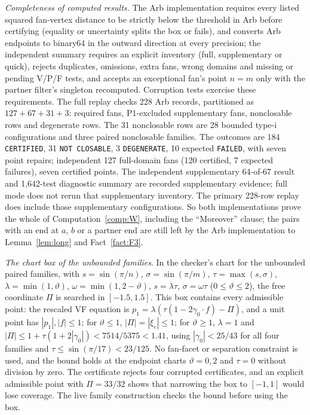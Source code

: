 \documentclass[11pt]{article}
\theoremstyle{definition}
\theoremstyle{remark}
\begin{document}
\noindent\emph{Completeness of computed results.} The Arb implementation requires every listed squared fan-vertex distance to be
strictly below the threshold in Arb before certifying (equality or
uncertainty splits the box or fails), and converts Arb endpoints to binary64
in the outward direction at every precision; the independent summary
requires an explicit inventory (full, supplementary or quick), rejects
duplicates, omissions, extra fans, wrong domains and missing or pending
V/P/F tests, and accepts an exceptional fan's point $n=m$ only with the
partner filter's singleton recomputed. Corruption tests exercise these requirements. The full replay checks
228 Arb records, partitioned as $127+67+31+3$: required fans,
P1-excluded supplementary fans, nonclosable rows and degenerate rows.
The 31 nonclosable rows are 28 bounded type-i configurations and three
paired nonclosable families. The outcomes are 184 \texttt{CERTIFIED}, 31 \texttt{NOT CLOSABLE}, 3
\texttt{DEGENERATE}, 10 expected \texttt{FAILED}, with seven point repairs;
independent 127 full-domain fans (120 certified, 7 expected failures), seven
certified points. The independent supplementary 64-of-67 result and
1,642-test diagnostic summary are recorded supplementary evidence; full
mode does not rerun that supplementary inventory. The primary 228-row
replay does include those supplementary configurations. So both implementations prove the
whole of Computation~\ref{comp:W}, including the ``Moreover'' clause; the
pairs with an end at $a$, $b$ or a partner end are still left by the
Arb implementation to Lemma~\ref{lem:long} and Fact~\ref{fact:F3}.

\noindent\emph{The chart box of the unbounded families}.
In the checker's chart for the unbounded paired families, with
$s=\sin(\pi/n)$, $\sigma=\sin(\pi/m)$, $\tau=\max(s,\sigma)$,
$\lambda=\min(1,\vartheta)$, $\omega=\min(1,2-\vartheta)$, $s=\lambda\tau$,
$\sigma=\omega\tau$ ($0\le\vartheta\le2$), the free coordinate $\Pi$ is
searched in $[-1.5,1.5]$. This box contains every admissible point: the
rescaled VF equation is $p_1=\lambda(\tau(1-2\gamma_0\cdot f)-\Pi)$, and
a unit point has $|p_1|,|f|\le1$; for $\vartheta\le1$, $|\Pi|=|\xi_e|\le1$;
for $\vartheta\ge1$, $\lambda=1$ and
$|\Pi|\le1+\tau(1+2|\gamma_0|)<7514/5375<1.41$, using $|\gamma_0|<25/43$
for all four families and $\tau\le\sin(\pi/17)<23/125$. No fan-facet or
separation constraint is used, and the bound holds at the endpoint charts
$\vartheta=0,2$ and $\tau=0$ without division by zero. The certificate
 rejects
four corrupted certificates, and an explicit admissible point with
$\Pi=33/32$ shows that narrowing the box to $[-1,1]$ would lose
coverage. The live family construction checks the bound before using the
box.
\end{document}
